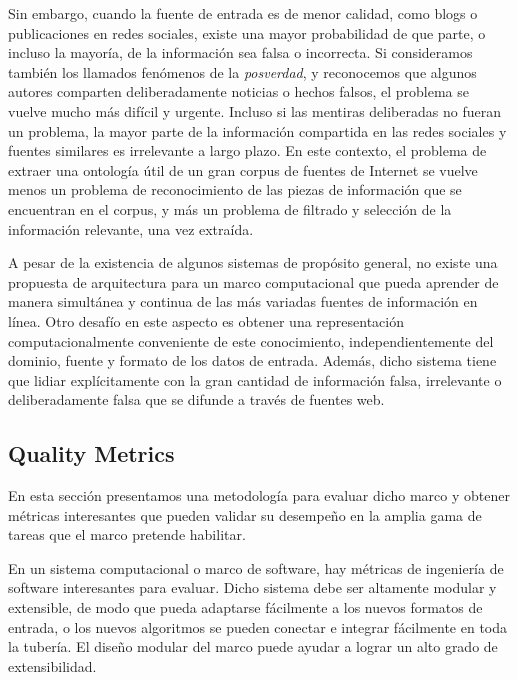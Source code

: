 Sin embargo, cuando la fuente de entrada es de menor calidad, como blogs o publicaciones en redes sociales, existe una mayor probabilidad de que parte, o incluso la mayoría, de la información sea falsa o incorrecta. Si consideramos también los llamados fenómenos de la \textit{posverdad}, y reconocemos que algunos autores comparten deliberadamente noticias o hechos falsos, el problema se vuelve mucho más difícil y urgente. Incluso si las mentiras deliberadas no fueran un problema, la mayor parte de la información compartida en las redes sociales y fuentes similares es irrelevante a largo plazo. En este contexto, el problema de extraer una ontología útil de un gran corpus de fuentes de Internet se vuelve menos un problema de reconocimiento de las piezas de información que se encuentran en el corpus, y más un problema de filtrado y selección de la información relevante, una vez extraída.

A pesar de la existencia de algunos sistemas de propósito general, no existe una propuesta de arquitectura para un marco computacional que pueda aprender de manera simultánea y continua de las más variadas fuentes de información en línea. Otro desafío en este aspecto es obtener una representación computacionalmente conveniente de este conocimiento, independientemente del dominio, fuente y formato de los datos de entrada. Además, dicho sistema tiene que lidiar explícitamente con la gran cantidad de información falsa, irrelevante o deliberadamente falsa que se difunde a través de fuentes web.

\subsection{Quality Metrics}\label{sec: evaluación}

    En esta sección presentamos una metodología para evaluar dicho marco y obtener métricas interesantes que pueden validar su desempeño en la amplia gama de tareas que el marco pretende habilitar.

    En un sistema computacional o marco de software, hay métricas de ingeniería de software interesantes para evaluar.
    Dicho sistema debe ser altamente modular y extensible, de modo que pueda adaptarse fácilmente a los nuevos formatos de entrada, o los nuevos algoritmos se pueden conectar e integrar fácilmente en toda la tubería.
    El diseño modular del marco puede ayudar a lograr un alto grado de extensibilidad.

